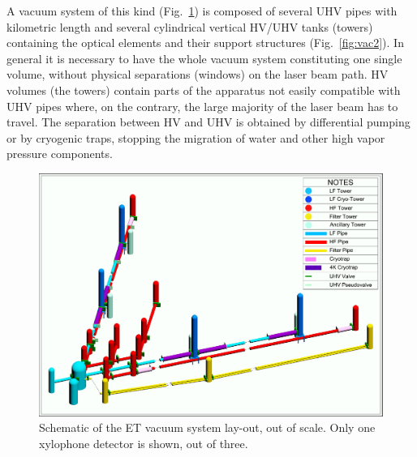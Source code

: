A vacuum system of this kind (Fig.~\ref{fig:vac1}) is composed of several UHV pipes with kilometric length and several cylindrical vertical HV/UHV tanks (towers) containing the optical elements and their support structures (Fig.~\ref{fig:vac2}). In general it is necessary to have the whole vacuum system constituting one single volume, without physical separations (windows) on the laser beam path. HV volumes (the towers) contain parts of the apparatus not easily compatible with UHV pipes where, on the contrary, the large majority of the laser beam has to travel. The separation between HV and UHV is obtained by differential pumping or by cryogenic traps, stopping the migration of water and other high vapor pressure components.

\begin{figure}
\begin{center}
\includegraphics[width=\textwidth]{Sec_SiteInfra/Figures/VAC1.pdf}
\caption{Schematic of the ET vacuum system lay-out, out of scale. Only one xylophone detector is shown, out of three.}
\label{fig:vac1}
\end{center}
\end{figure}

